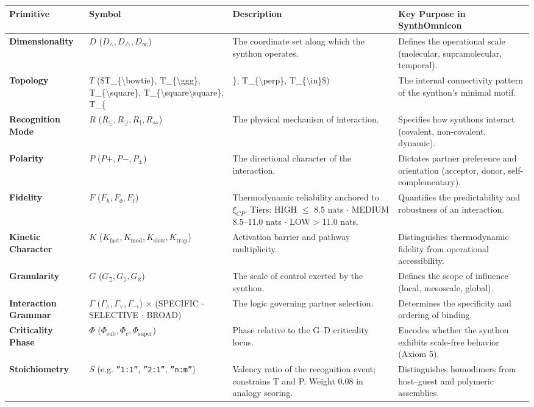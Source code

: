 \documentclass[12pt,a4paper]{article}
\begin{document}
\begin{table}[htbp]
\centering
\small
{}
\begin{tabularx}{\textwidth}{>{\centering\arraybackslash}X >{\centering\arraybackslash}X >{\centering\arraybackslash}X >{\centering\arraybackslash}X}
\toprule
\rowcolor{gray!25}\textbf{Primitive} & \textbf{Symbol} & \textbf{Description} & \textbf{Key Purpose in SynthOmnicon} \\
\midrule
\rowcolors{1}{white}{gray!10}
\textbf{Dimensionality} & $D$ ($D_{\wedge}, D_{\bigtriangleup}, D_{\infty}$) & The coordinate set along which the synthon operates. & Defines the operational scale (molecular, supramolecular, temporal). \\
\textbf{Topology} & $T$ (\$T\_\{\textbackslash{}bowtie\}, T\_\{\textbackslash{}ggg\}, T\_\{\textbackslash{}square\}, T\_\{\textbackslash{}square\textbackslash{}square\}, T\_\{ & \}, T\_\{\textbackslash{}perp\}, T\_\{\textbackslash{}in\}\$) & The internal connectivity pattern of the synthon's minimal motif. \\
\textbf{Recognition Mode} & $R$ ($R_{\subseteq}, R_{\supseteq}, R_{\ddagger}, R_{\Leftrightarrow}$) & The physical mechanism of interaction. & Specifies how synthons interact (covalent, non-covalent, dynamic). \\
\textbf{Polarity} & $P$ ($P+, P-, P_{\pm}$) & The directional character of the interaction. & Dictates partner preference and orientation (acceptor, donor, self-complementary). \\
\textbf{Fidelity} & $F$ ($F_{\hbar}, F_{\eth}, F_{\ell}$) & Thermodynamic reliability anchored to $\xi_{CP}$. Tiers: HIGH $\leq$ 8.5 nats $\cdot$ MEDIUM 8.5--11.0 nats $\cdot$ LOW \textgreater{} 11.0 nats. & Quantifies the predictability and robustness of an interaction. \\
\textbf{Kinetic Character} & $K$ ($K_{\text{fast}}, K_{\text{mod}}, K_{\text{slow}}, K_{\text{trap}}$) & Activation barrier and pathway multiplicity. & Distinguishes thermodynamic fidelity from operational accessibility. \\
\textbf{Granularity} & $G$ ($G_{\beth}, G_{\gimel}, G_{\aleph}$) & The scale of control exerted by the synthon. & Defines the scope of influence (local, mesoscale, global). \\
\textbf{Interaction Grammar} & $\Gamma$ ($\Gamma_{\wedge}, \Gamma_{\vee}, \Gamma_{\to}$) $\times$ (SPECIFIC $\cdot$ SELECTIVE $\cdot$ BROAD) & The logic governing partner selection. & Determines the specificity and ordering of binding. \\
\textbf{Criticality Phase} & $\Phi$ ($\Phi_{\text{sub}}, \Phi_c, \Phi_{\text{super}}$) & Phase relative to the G--D criticality locus. & Encodes whether the synthon exhibits scale-free behavior (Axiom 5). \\
\textbf{Stoichiometry} & $S$ (e.g. \texttt{''1:1''}, \texttt{''2:1''}, \texttt{''n:m''}) & Valency ratio of the recognition event; constrains T and P. Weight 0.08 in analogy scoring. & Distinguishes homodimers from host--guest and polymeric assemblies. \\
\bottomrule
\end{tabularx}
\end{table}
\end{document}
